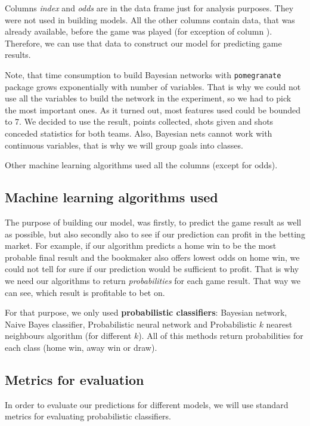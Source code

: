 \documentclass[conference]{IEEEtran}
\begin{document}
Columns \textit{index} and \textit{odds} are in the data frame just for analysis purposes. They were not used in building models.
All the other columns contain data, that was already available, before the game was played (for exception of column ). Therefore, we can use that data to construct our model for predicting game results.

Note, that time consumption to build Bayesian networks with
\texttt{pomegranate} package grows exponentially with number of 
variables. That is why we could not use all the variables to build the network
in the experiment,
so we had to pick the most important ones. As it turned out, most 
features used could be bounded to 7. We decided to use the 
result, points collected, shots given and shots conceded statistics
for both teams. Also, Bayesian nets cannot work with continuous variables, that is 
why we will group goals into classes.

Other machine learning algorithms used all the columns (except 
for odds).

\subsection{Machine learning algorithms used}

The purpose of building our model, was firstly, to predict the game result as well as possible, but also secondly also to see if our
prediction can profit in the betting market. For example, if our algorithm predicts a home win to be the most probable final 
result and the bookmaker also offers lowest odds on home win, we could not tell for sure if our prediction would be sufficient to
profit. That is why we need our algorithms to return \textit{probabilities} for each game result. That way we can see, which result is profitable to bet on.

For that purpose, we only used \textbf{probabilistic classifiers}: Bayesian network, Naive Bayes classifier, Probabilistic neural 
network and Probabilistic $k$ nearest neighbours algorithm (for different $k$). All of this methods return probabilities for each
class (home win, away win or draw).

\subsection{Metrics for evaluation}

In order to evaluate our predictions for different models, we will use standard metrics for evaluating probabilistic classifiers. 
\end{document}
